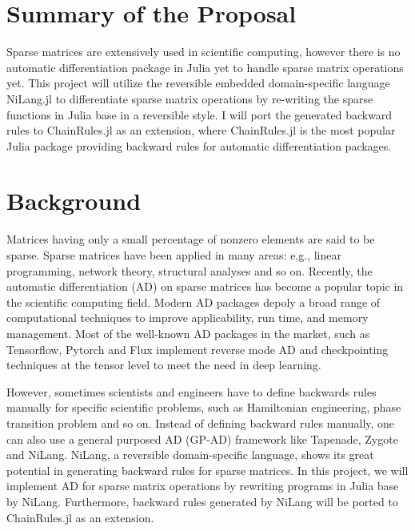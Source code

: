 \section{Summary of the Proposal}

Sparse matrices are extensively used in scientific computing, however there is no automatic differentiation package in Julia yet to handle sparse matrix operations yet. This project will utilize the reversible embedded domain-specific language NiLang.jl to differentiate sparse matrix operations by re-writing the sparse functions in Julia base in a reversible style. I will port the generated backward rules to ChainRules.jl as an extension, where ChainRules.jl is the most popular Julia package providing backward rules for automatic differentiation packages. 

\section{Background}

\par Matrices having only a small percentage of nonzero elements are said to be sparse. Sparse matrices have been applied in many areas: e.g., linear programming, network theory, structural analyses and so on. Recently, the automatic differentiation (AD) on sparse matrices has become a popular topic in the scientific computing field. Modern AD packages depoly a broad range of computational techniques to improve applicability, run time, and memory management. Most of the well-known AD packages in the market, such as Tensorflow, Pytorch and Flux implement reverse mode AD and checkpointing techniques at the tensor level to meet the need in deep learning.  

\par However, sometimes scientists and engineers have to define backwards rules manually for specific scientific problems, such as Hamiltonian engineering, phase transition problem and so on. Instead of defining backward rules manually, one can also use a general purposed AD (GP-AD) framework like Tapenade, Zygote and NiLang\cite{liu2020differentiate}. NiLang, a reversible domain-specific language, shows its great potential in generating backward rules for sparse matrices. In this project, we will implement AD for sparse matrix operations by rewriting programs in Julia base by NiLang. Furthermore, backward rules generated by NiLang will be ported to ChainRules.jl as an extension. 

